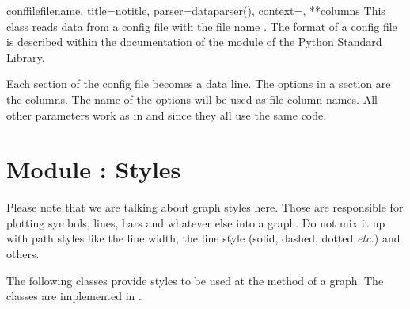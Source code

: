 \begin{classdesc}{conffile}{filename, title=notitle, parser=dataparser(),
                            context={}, **columns}
  This class reads data from a config file with the file name
  . The format of a config file is described within the
  documentation of the  module of the Python
  Standard Library.

  Each section of the config file becomes a data line. The options in
  a section are the columns. The name of the options will be used as
  file column names. All other parameters work as in
   and  since they all use
  the same code.
\end{classdesc}

\section{Module : Styles}
\label{graph:style}


Please note that we are talking about graph styles here. Those are
responsible for plotting symbols, lines, bars and whatever else into a
graph. Do not mix it up with path styles like the line width, the line
style (solid, dashed, dotted \emph{etc.}) and others.

The following classes provide styles to be used at the 
method of a graph. The classes are implemented in .

